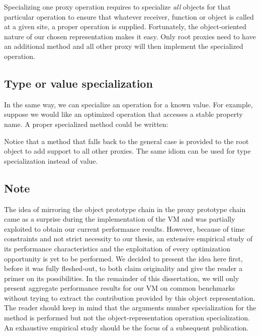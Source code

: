 
Specializing one proxy operation requires to specialize \textit{all} objects
for that particular operation to ensure that whatever receiver, function or
object is called at a given site, a proper operation is supplied. Fortunately,
the object-oriented nature of our chosen representation makes it easy. Only
root proxies need to have an additional method and all other proxy will then
implement the specialized operation.

\subsection{Type or value specialization}

In the same way, we can specialize an operation for a known value. For
example, suppose we would like an optimized operation that accesses a stable
property name. A proper specialized method could be written:


Notice that a method that falls back to the general case is provided to the
root object to add support to all other proxies. The same idiom can be used for
type specialization instead of value.

\subsection{Note}

The idea of mirroring the object prototype chain in the proxy prototype chain
came as a surprise during the implementation of the VM and was partially
exploited to obtain our current performance results. However, because of time
constraints and not strict necessity to our thesis, an extensive empirical
study of its performance characteristics and the exploitation of every
optimization opportunity is yet to be performed. We decided to present the idea
here first, before it was fully fleshed-out, to both claim originality and give
the reader a primer on its possibilities. In the remainder of this
dissertation, we will only present aggregate performance results for our VM on
common benchmarks without trying to extract the contribution provided by this
object representation. The reader should keep in mind that the arguments number
specialization for the  method is performed but not the
object-representation operation specialization. An exhaustive empirical study
should be the focus of a subsequent publication.

